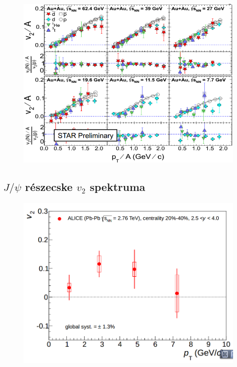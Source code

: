\documentclass{beamer}
\begin{document}
\begin{frame}
\begin{center}
\begin{figure}[H]
	\centering
    		\includegraphics[scale=0.3]{pic/scal_A}
\end{figure}
\end{center}
\end{frame}
\subsection{$J/\psi$ részecske $v_2$ spektruma}
\begin{frame}
\begin{center}
\begin{figure}[H]
	\centering
    		\includegraphics[scale=0.3]{pic/v2_jpsi}
\end{figure}
\end{center}
\end{frame}
\end{document}
